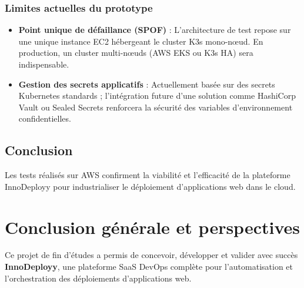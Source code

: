 \documentclass[12pt,a4paper,oneside]{report}
\begin{document}
\subsection{Limites actuelles du prototype}
\begin{itemize}[label=$\triangle$]
    \item \textbf{Point unique de défaillance (SPOF)} : L'architecture de test repose sur une unique instance EC2 hébergeant le cluster K3s mono-nœud. En production, un cluster multi-nœuds (AWS EKS ou K3s HA) sera indispensable.
    \item \textbf{Gestion des secrets applicatifs} : Actuellement basée sur des secrets Kubernetes standards ; l'intégration future d'une solution comme HashiCorp Vault ou Sealed Secrets renforcera la sécurité des variables d'environnement confidentielles.
\end{itemize}

\section{Conclusion}
Les tests réalisés sur AWS confirment la viabilité et l'efficacité de la plateforme InnoDeployy pour industrialiser le déploiement d'applications web dans le cloud.

\clearpage

\chapter*{Conclusion générale et perspectives}

Ce projet de fin d'études a permis de concevoir, développer et valider avec succès \textbf{InnoDeployy}, une plateforme SaaS DevOps complète pour l'automatisation et l'orchestration des déploiements d'applications web.
\end{document}
